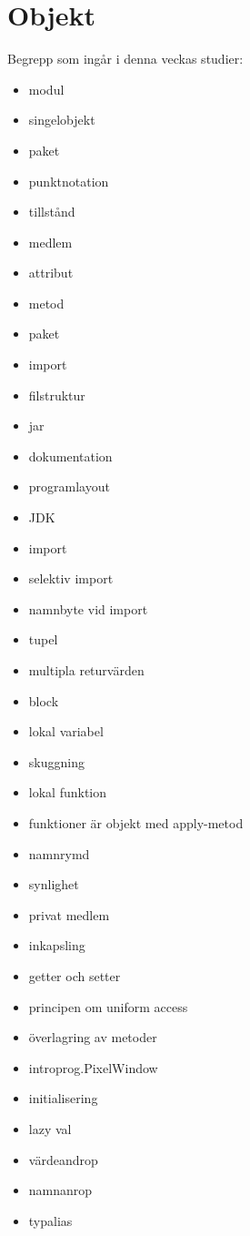 \chapter{Objekt}\label{chapter:W04}
Begrepp som ingår i denna veckas studier:
\begin{multicols}{2}\begin{itemize}[noitemsep,label={$\square$},leftmargin=*]
\item modul
\item singelobjekt
\item paket
\item punktnotation
\item tillstånd
\item medlem
\item attribut
\item metod
\item paket
\item import
\item filstruktur
\item jar
\item dokumentation
\item programlayout
\item JDK
\item import
\item selektiv import
\item namnbyte vid import
\item tupel
\item multipla returvärden
\item block
\item lokal variabel
\item skuggning
\item lokal funktion
\item funktioner är objekt med apply-metod
\item namnrymd
\item synlighet
\item privat medlem
\item inkapsling
\item getter och setter
\item principen om uniform access
\item överlagring av metoder
\item introprog.PixelWindow
\item initialisering
\item lazy val
\item värdeandrop
\item namnanrop
\item typalias\end{itemize}\end{multicols}
